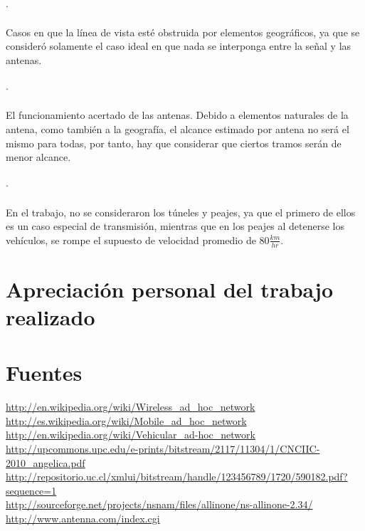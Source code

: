 \documentclass[12pt]{article}
\begin{document}
\paragraph{$\cdot$}Casos en que la línea de vista esté obstruida por elementos geográficos, ya que se 
consideró solamente el caso ideal en que nada se interponga entre la señal y las antenas.
\paragraph{$\cdot$}El funcionamiento acertado de las antenas. Debido a elementos naturales de la antena, 
como también a la geografía, el alcance estimado por antena no será el mismo para todas, por tanto, hay 
que considerar que ciertos tramos serán de menor alcance.
\paragraph{$\cdot$}En el trabajo, no se consideraron los túneles y peajes, ya que el primero de ellos es 
un caso especial de transmisión, mientras que en los peajes al detenerse los vehículos, se rompe el 
supuesto de velocidad promedio de $80 \frac{km}{hr}.$

\newpage
\section{Apreciación personal del trabajo realizado}

\newpage

%
\section{Fuentes}
\url{http://en.wikipedia.org/wiki/Wireless_ad_hoc_network}\\

\url{http://es.wikipedia.org/wiki/Mobile_ad_hoc_network}\\

\url{http://en.wikipedia.org/wiki/Vehicular_ad-hoc_network}\\

\url{http://upcommons.upc.edu/e-prints/bitstream/2117/11304/1/CNCIIC-2010_angelica.pdf}\\

\url{http://repositorio.uc.cl/xmlui/bitstream/handle/123456789/1720/590182.pdf?sequence=1}\\

\url{http://sourceforge.net/projects/nsnam/files/allinone/ns-allinone-2.34/}\\

\url{http://www.antenna.com/index.cgi}\\

\end{document}
